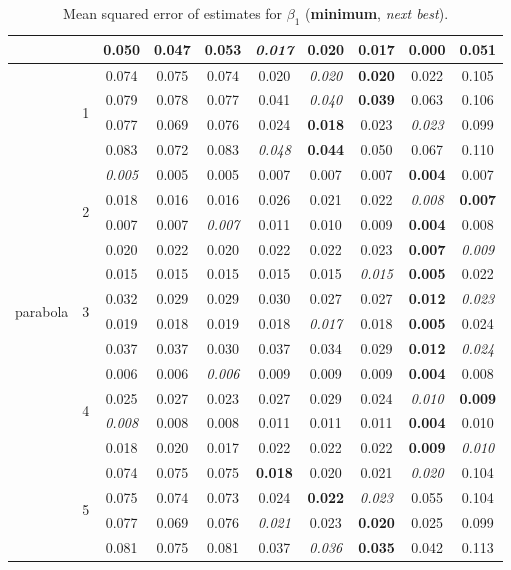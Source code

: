 \documentclass[authoryear, review, 11pt]{elsarticle}
\begin{document}
\begin{table}
\begin{center}
{\begin{tabular}{cccccccccc}
		  &  & 0.050 & 0.047 & 0.053 & \emph{0.017} & 0.020 & 0.017 & \textbf{0.000} & 0.051 \\ 
		  \hline
		  \multirow{20}{*}{parabola} & \multirow{4}{*}{1} & 0.074 & 0.075 & 0.074 & 0.020 & \emph{0.020} & \textbf{0.020} & 0.022 & 0.105 \\ 
		  &  & 0.079 & 0.078 & 0.077 & 0.041 & \emph{0.040} & \textbf{0.039} & 0.063 & 0.106 \\ 
		  &  & 0.077 & 0.069 & 0.076 & 0.024 & \textbf{0.018} & 0.023 & \emph{0.023} & 0.099 \\ 
		  &  & 0.083 & 0.072 & 0.083 & \emph{0.048} & \textbf{0.044} & 0.050 & 0.067 & 0.110 \\ 
		  \cline{3-10}
		  & \multirow{4}{*}{2} & \emph{0.005} & 0.005 & 0.005 & 0.007 & 0.007 & 0.007 & \textbf{0.004} & 0.007 \\ 
		  &  & 0.018 & 0.016 & 0.016 & 0.026 & 0.021 & 0.022 & \emph{0.008} & \textbf{0.007} \\ 
		  &  & 0.007 & 0.007 & \emph{0.007} & 0.011 & 0.010 & 0.009 & \textbf{0.004} & 0.008 \\ 
		  &  & 0.020 & 0.022 & 0.020 & 0.022 & 0.022 & 0.023 & \textbf{0.007} & \emph{0.009} \\ 
		  \cline{3-10}
		  & \multirow{4}{*}{3} & 0.015 & 0.015 & 0.015 & 0.015 & 0.015 & \emph{0.015} & \textbf{0.005} & 0.022 \\ 
		  &  & 0.032 & 0.029 & 0.029 & 0.030 & 0.027 & 0.027 & \textbf{0.012} & \emph{0.023} \\ 
		  &  & 0.019 & 0.018 & 0.019 & 0.018 & \emph{0.017} & 0.018 & \textbf{0.005} & 0.024 \\ 
		  &  & 0.037 & 0.037 & 0.030 & 0.037 & 0.034 & 0.029 & \textbf{0.012} & \emph{0.024} \\ 
		  \cline{3-10}
		  & \multirow{4}{*}{4} & 0.006 & 0.006 & \emph{0.006} & 0.009 & 0.009 & 0.009 & \textbf{0.004} & 0.008 \\ 
		  &  & 0.025 & 0.027 & 0.023 & 0.027 & 0.029 & 0.024 & \emph{0.010} & \textbf{0.009} \\ 
		  &  & \emph{0.008} & 0.008 & 0.008 & 0.011 & 0.011 & 0.011 & \textbf{0.004} & 0.010 \\ 
		  &  & 0.018 & 0.020 & 0.017 & 0.022 & 0.022 & 0.022 & \textbf{0.009} & \emph{0.010} \\ 
		  \cline{3-10}
		  & \multirow{4}{*}{5} & 0.074 & 0.075 & 0.075 & \textbf{0.018} & 0.020 & 0.021 & \emph{0.020} & 0.104 \\ 
		  &  & 0.075 & 0.074 & 0.073 & 0.024 & \textbf{0.022} & \emph{0.023} & 0.055 & 0.104 \\ 
		  &  & 0.077 & 0.069 & 0.076 & \emph{0.021} & 0.023 & \textbf{0.020} & 0.025 & 0.099 \\ 
		  &  & 0.081 & 0.075 & 0.081 & 0.037 & \emph{0.036} & \textbf{0.035} & 0.042 & 0.113 \\
		\end{tabular}}
		\caption{Mean squared error of estimates for $\beta_1$ (\textbf{minimum}, \emph{next best}).\label{table:X1-MSEX}}
		\end{center}
		\end{table}
		
\end{document}

